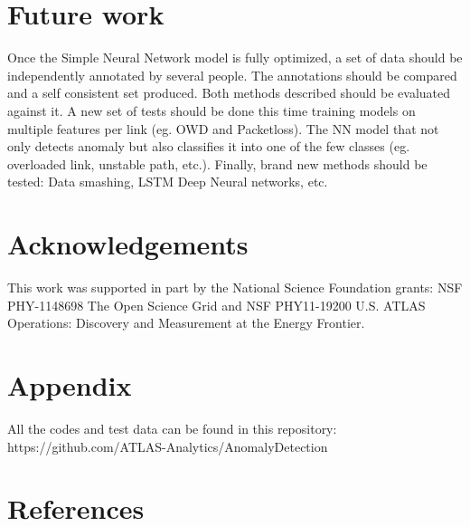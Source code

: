 \documentclass[5p]{elsarticle}
\begin{document}
\section{Future work}
Once the Simple Neural Network model is fully optimized, a set of data should be independently annotated by several people. The annotations should be compared and a self consistent set produced. Both methods described should be evaluated against it. A new set of tests should be done this time training models on multiple features per link (eg. OWD and Packetloss). The NN model that not only detects anomaly but also classifies it into one of the few classes (eg. overloaded link, unstable path, etc.). Finally, brand new methods should be tested: Data smashing\cite{devet}, LSTM Deep Neural networks, etc.   

\section{Acknowledgements}

This work was supported in part by the National Science Foundation grants: NSF PHY-1148698 The Open Science Grid and NSF PHY11-19200 U.S. ATLAS Operations: Discovery and Measurement at the Energy Frontier.

\section{Appendix}

All the codes and test data can be found in this repository:\\
https://github.com/ATLAS-Analytics/AnomalyDetection

\section*{References}



\end{document}
